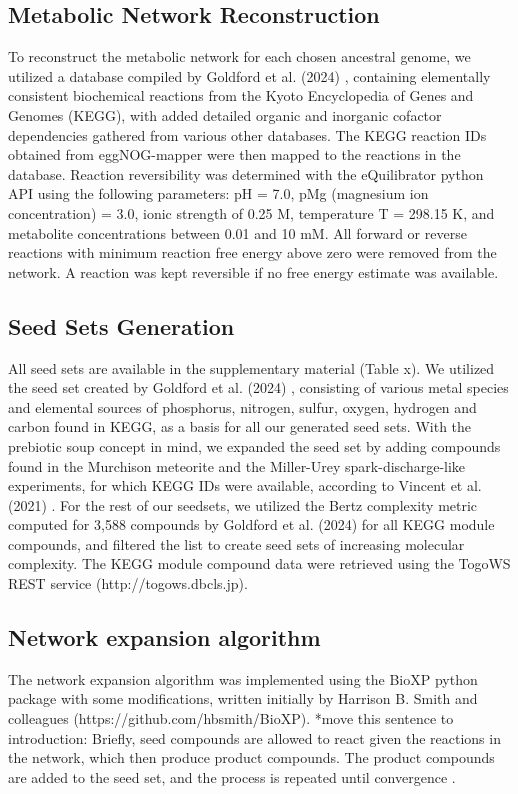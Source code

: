 \subsection*{Metabolic Network Reconstruction}


To reconstruct the metabolic network for each chosen ancestral genome, we utilized a database compiled by Goldford et al. (2024) \cite{goldford2024}, containing elementally consistent biochemical reactions from the Kyoto Encyclopedia of Genes and Genomes (KEGG), with added detailed organic and inorganic cofactor dependencies gathered from various other databases. The KEGG reaction IDs obtained from eggNOG-mapper were then mapped to the reactions in the database. Reaction reversibility was determined with the eQuilibrator python API \cite{beber2022} using the following parameters: pH = 7.0, pMg (magnesium ion concentration) = 3.0, ionic strength of 0.25 M, temperature T = 298.15 K, and metabolite concentrations between 0.01 and 10 mM. All forward or reverse reactions with minimum reaction free energy above zero were removed from the network. A reaction was kept reversible if no free energy estimate was available.

\subsection*{Seed Sets Generation}

All seed sets are available in the supplementary material (Table x). We utilized the seed set created by Goldford et al. (2024) \cite{goldford2024}, consisting of various metal species and elemental sources of phosphorus, nitrogen, sulfur, oxygen, hydrogen and carbon found in KEGG, as a basis for all our generated seed sets. With the prebiotic soup concept in mind, we expanded the seed set by adding compounds found in the Murchison meteorite and the Miller-Urey spark-discharge-like experiments, for which KEGG IDs were available, according to Vincent et al. (2021) \cite{vincent2021}. For the rest of our seedsets, we utilized the Bertz complexity metric computed for 3,588 compounds by Goldford et al. (2024) for all KEGG module compounds, and filtered the list to create seed sets of increasing molecular complexity. The KEGG module compound data were retrieved using the TogoWS REST service (http://togows.dbcls.jp).


\subsection*{Network expansion algorithm} 

The network expansion algorithm was implemented using the BioXP python package with some modifications, written initially by Harrison B. Smith and colleagues (https://github.com/hbsmith/BioXP). *move this sentence to introduction: Briefly, seed compounds are allowed to react given the reactions in the network, which then produce product compounds. The product compounds are added to the seed set, and the process is repeated until convergence \cite{handorf2005}. 